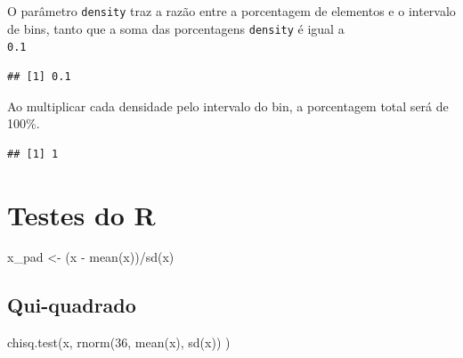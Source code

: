 \documentclass[
]{article}
\newenvironment{Shaded}{\begin{snugshade}}{\end{snugshade}}
\newcommand{\CommentTok}[1]{\textcolor[rgb]{0.56,0.35,0.01}{\textit{#1}}}
\newcommand{\DecValTok}[1]{\textcolor[rgb]{0.00,0.00,0.81}{#1}}
\newcommand{\FunctionTok}[1]{\textcolor[rgb]{0.00,0.00,0.00}{#1}}
\newcommand{\NormalTok}[1]{#1}
\newcommand{\OtherTok}[1]{\textcolor[rgb]{0.56,0.35,0.01}{#1}}
\newcommand{\SpecialCharTok}[1]{\textcolor[rgb]{0.00,0.00,0.00}{#1}}
\begin{document}
O parâmetro \texttt{density} traz a razão entre a porcentagem de
elementos e o intervalo de bins, tanto que a soma das porcentagens
\texttt{density} é igual a\\
\texttt{0.1}

\begin{Shaded}
\end{Shaded}

\begin{verbatim}
## [1] 0.1
\end{verbatim}

Ao multiplicar cada densidade pelo intervalo do bin, a porcentagem total
será de 100\%.

\begin{Shaded}
\end{Shaded}

\begin{verbatim}
## [1] 1
\end{verbatim}

\hypertarget{testes-do-r}{%
\section{Testes do R}\label{testes-do-r}}

\begin{Shaded}
\begin{Highlighting}[]
\NormalTok{x\_pad }\OtherTok{\textless{}{-}}\NormalTok{ (x }\SpecialCharTok{{-}} \FunctionTok{mean}\NormalTok{(x))}\SpecialCharTok{/}\FunctionTok{sd}\NormalTok{(x)}
\end{Highlighting}
\end{Shaded}

\hypertarget{qui-quadrado}{%
\subsection{Qui-quadrado}\label{qui-quadrado}}

\begin{Shaded}
\begin{Highlighting}[]
\FunctionTok{chisq.test}\NormalTok{(x, }\FunctionTok{rnorm}\NormalTok{(}\DecValTok{36}\NormalTok{, }\FunctionTok{mean}\NormalTok{(x), }\FunctionTok{sd}\NormalTok{(x)) )}
\end{Highlighting}
\end{Shaded}
\end{document}
